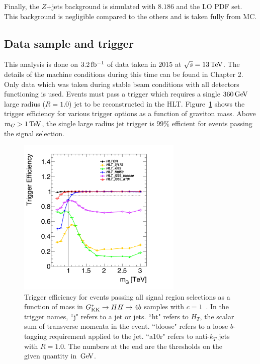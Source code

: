 Finally, the $Z$+jets background is simulated with \PYTHIA $8.186$ and the  LO PDF set. This background is negligible compared to the others and is taken fully from MC. 

\subsection{Data sample and trigger}

This analysis is done on $3.2 \mbox{\,fb$^{-1}$}$ of data taken in $2015$ at $\sqrt{s} = 13 \TeV$. The details of the machine conditions during this time can be found in Chapter 2. Only data which was taken during stable beam conditions with all detectors functioning is used. Events must pass a trigger which requires a single $360 \GeV$ large radius ($R=1.0$) jet to be reconstructed in the HLT. Figure~\ref{fig:trig_eff_4b} shows the trigger efficiency for various trigger options as a function of graviton mass. Above $m_{G} > 1 \TeV$, the single large radius jet trigger is $99\%$ efficient for events passing the signal selection. 

\begin{figure}[h!]
  \centering
  \captionsetup{justification=centering}

  \includegraphics[width=0.7\textwidth]{figures/PassSignal_HLTeff}
  \caption{Trigger efficiency for events passing all signal region selections as a function of mass in $G^*_{\rm KK} \to HH \to 4b$ samples with $c = 1$~\cite{Tony}. In the trigger names, ``j" refers to a jet or jets. ``ht" refers to $H_{T}$, the scalar sum of transverse momenta in the event. ``bloose" refers to a loose $b$-tagging requirement applied to the jet. ``a10r" refers to anti-$k_{T}$ jets with $R = 1.0$. The numbers at the end are the thresholds on the given quantity in $\GeV$.}
  \label{fig:trig_eff_4b}
\end{figure}



